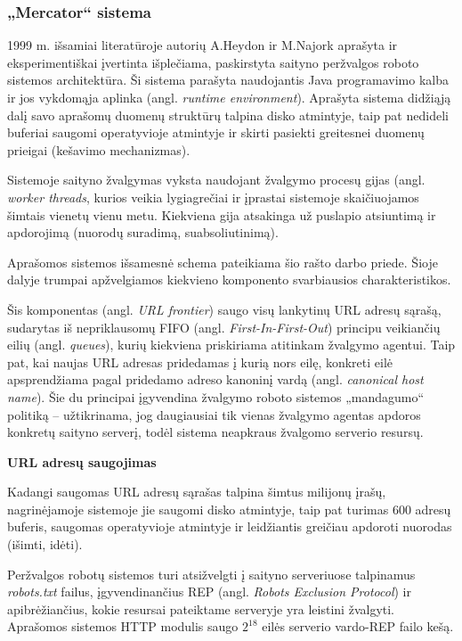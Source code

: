 \subsubsection{„Mercator“ sistema}

1999 m. išsamiai literatūroje autorių A.Heydon ir M.Najork aprašyta ir eksperimentiškai įvertinta išplečiama, paskirstyta saityno peržvalgos roboto sistemos architektūra. Ši sistema parašyta naudojantis Java programavimo kalba ir jos vykdomąja aplinka (angl. \textit{runtime environment}). Aprašyta sistema didžiąją dalį savo aprašomų duomenų struktūrų talpina disko atmintyje, taip pat nedideli buferiai saugomi operatyvioje atmintyje ir skirti pasiekti greitesnei duomenų prieigai (kešavimo mechanizmas).


Sistemoje saityno žvalgymas vyksta naudojant žvalgymo procesų gijas (angl. \textit{worker threads}, kurios veikia lygiagrečiai ir įprastai sistemoje skaičiuojamos šimtais vienetų vienu metu. Kiekviena gija atsakinga už puslapio atsiuntimą ir apdorojimą (nuorodų suradimą, suabsoliutinimą).


Aprašomos sistemos išsamesnė schema pateikiama šio rašto darbo priede. Šioje dalyje trumpai apžvelgiamos kiekvieno komponento svarbiausios charakteristikos.



Šis komponentas (angl. \textit{URL frontier}) saugo visų lankytinų URL adresų sąrašą, sudarytas iš nepriklausomų FIFO (angl. \textit{First-In-First-Out}) principu veikiančių eilių (angl. \textit{queues}), kurių kiekviena priskiriama atitinkam žvalgymo agentui. Taip pat, kai naujas URL adresas pridedamas į kurią nors eilę, konkreti eilė apsprendžiama pagal pridedamo adreso kanoninį vardą (angl. \textit{canonical host name}). Šie du principai įgyvendina žvalgymo roboto sistemos „mandagumo“ politiką -- užtikrinama, jog daugiausiai tik vienas žvalgymo agentas apdoros konkretų saityno serverį, todėl sistema neapkraus žvalgomo serverio resursų.

\vspace{1em}
\textbf{URL adresų saugojimas}
\vspace{1em}

Kadangi saugomas URL adresų sąrašas talpina šimtus milijonų įrašų, nagrinėjamoje sistemoje jie saugomi disko atmintyje, taip pat turimas 600 adresų buferis, saugomas operatyvioje atmintyje ir leidžiantis greičiau apdoroti nuorodas (išimti, idėti).


Peržvalgos robotų sistemos turi atsižvelgti į saityno serveriuose talpinamus \textit{robots.txt} failus, įgyvendinančius REP (angl. \textit{Robots Exclusion Protocol}) ir apibrėžiančius, kokie resursai pateiktame serveryje yra leistini žvalgyti. Aprašomos sistemos HTTP modulis saugo $2^18$ eilės serverio vardo-REP failo kešą.

